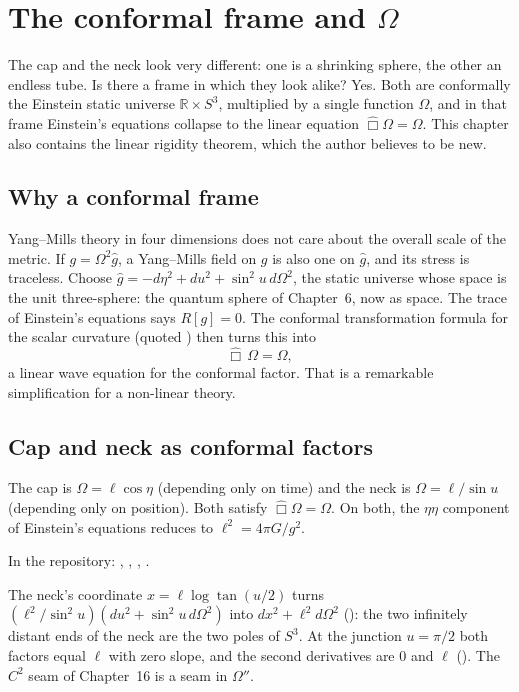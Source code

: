 \chapter{The conformal frame and $\Omega$}\label{ch:conformal}

\begin{questionbox}
The cap and the neck look very different: one is a shrinking sphere, the other an endless tube. Is there a frame in which they look alike? Yes. Both are conformally the Einstein static universe $\mathbb R\times S^3$, multiplied by a single function $\Omega$, and in that frame Einstein's equations collapse to the linear equation $\hat\Box\Omega=\Omega$. This chapter also contains the linear rigidity theorem, which the author believes to be new.
\end{questionbox}

\section{Why a conformal frame}

Yang--Mills theory in four dimensions does not care about the overall scale of the metric. If $g=\Omega^2\hat g$, a Yang--Mills field on $g$ is also one on $\hat g$, and its stress is traceless. Choose $\hat g=-d\eta^2+du^2+\sin^2u\,d\Omega^2$, the static universe whose space is the unit three-sphere: the quantum sphere of Chapter~6, now as space. The trace of Einstein's equations says $R[g]=0$. The conformal transformation formula for the scalar curvature (quoted \external) then turns this into
\[
\hat\Box\,\Omega=\Omega ,
\]
a linear wave equation for the conformal factor. That is a remarkable simplification for a non-linear theory.

\section{Cap and neck as conformal factors}

\begin{theorem}\proved
The cap is $\Omega=\ell\cos\eta$ (depending only on time) and the neck is $\Omega=\ell/\sin u$ (depending only on position). Both satisfy $\hat\Box\Omega=\Omega$. On both, the $\eta\eta$ component of Einstein's equations reduces to $\ell^2=4\pi G/g^2$.
\end{theorem}
\noindent In the repository: , , , .

The neck's coordinate $x=\ell\log\tan(u/2)$ turns $(\ell^2/\sin^2u)(du^2+\sin^2u\,d\Omega^2)$ into $dx^2+\ell^2d\Omega^2$ (): the two infinitely distant ends of the neck are the two poles of $S^3$. At the junction $u=\pi/2$ both factors equal $\ell$ with zero slope, and the second derivatives are $0$ and $\ell$ (). The $C^2$ seam of Chapter~16 is a seam in $\Omega''$.

